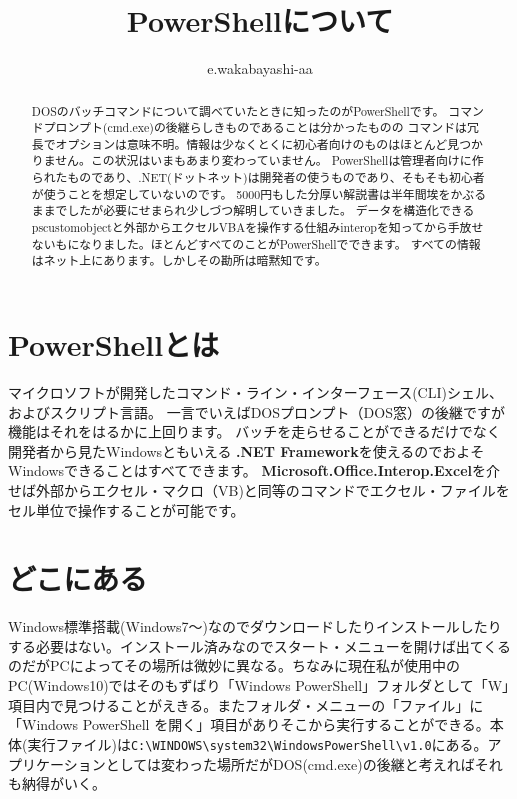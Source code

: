 \documentclass[dvipdfmx]{jsarticle}
\author{e.wakabayashi-aa}
\title{PowerShellについて}
\begin{document}
\maketitle

\begin{abstract}
DOSのバッチコマンドについて調べていたときに知ったのがPowerShellです。
コマンドプロンプト(cmd.exe)の後継らしきものであることは分かったものの
コマンドは冗長でオプションは意味不明。情報は少なくとくに初心者向けのものはほとんど見つかりません。この状況はいまもあまり変わっていません。
PowerShellは管理者向けに作られたものであり、.NET(ドットネット)は開発者の使うものであり、そもそも初心者が使うことを想定していないのです。
5000円もした分厚い解説書は半年間埃をかぶるままでしたが必要にせまられ少しづつ解明していきました。
データを構造化できるpscustomobjectと外部からエクセルVBAを操作する仕組みinteropを知ってから手放せないもになりました。ほとんどすべてのことがPowerShellでできます。
すべての情報はネット上にあります。しかしその勘所は暗黙知です。
\end{abstract}

\tableofcontents

\newpage

\section{PowerShellとは}

マイクロソフトが開発したコマンド・ライン・インターフェース(CLI)シェル、およびスクリプト言語。
一言でいえばDOSプロンプト（DOS窓）の後継ですが機能はそれをはるかに上回ります。
バッチを走らせることができるだけでなく開発者から見たWindowsともいえる \textbf{.NET Framework}を使えるのでおよそWindowsできることはすべてできます。
\textbf{Microsoft.Office.Interop.Excel}を介せば外部からエクセル・マクロ（VB)と同等のコマンドでエクセル・ファイルをセル単位で操作することが可能です。


\section{どこにある}
Windows標準搭載(Windows7～)なのでダウンロードしたりインストールしたりする必要はない。インストール済みなのでスタート・メニューを開けば出てくるのだがPCによってその場所は微妙に異なる。ちなみに現在私が使用中のPC(Windows10)ではそのもずばり「Windows PowerShell」フォルダとして「W」項目内で見つけることがえきる。またフォルダ・メニューの「ファイル」に「Windows PowerShell を開く」項目がありそこから実行することができる。本体(実行ファイル)は\verb+C:\WINDOWS\system32\WindowsPowerShell\v1.0+にある。アプリケーションとしては変わった場所だがDOS(cmd.exe)の後継と考えればそれも納得がいく。
\end{document}
